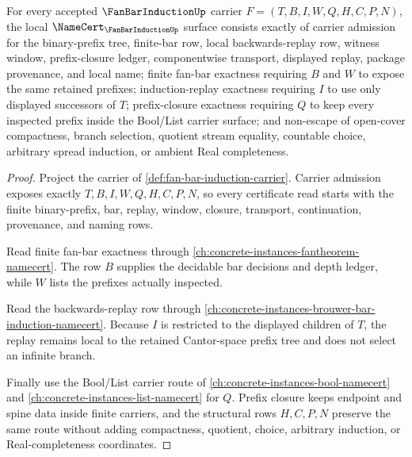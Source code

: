 \begin{theorem}
\label{thm:fan-bar-induction-namecert-obligations}
For every accepted $\FanBarInductionUp$ carrier $F=(T,B,I,W,Q,H,C,P,N)$, the local $\NameCert_{\FanBarInductionUp}$ surface consists exactly of carrier admission for the binary-prefix tree, finite-bar row, local backwards-replay row, witness window, prefix-closure ledger, componentwise transport, displayed replay, package provenance, and local name; finite fan-bar exactness requiring $B$ and $W$ to expose the same retained prefixes; induction-replay exactness requiring $I$ to use only displayed successors of $T$; prefix-closure exactness requiring $Q$ to keep every inspected prefix inside the Bool/List carrier surface; and non-escape of open-cover compactness, branch selection, quotient stream equality, countable choice, arbitrary spread induction, or ambient Real completeness.
\end{theorem}
\begin{proof}
Project the carrier of \autoref{def:fan-bar-induction-carrier}. Carrier admission exposes exactly $T,B,I,W,Q,H,C,P,N$, so every certificate read starts with the finite binary-prefix, bar, replay, window, closure, transport, continuation, provenance, and naming rows.

Read finite fan-bar exactness through \autoref{ch:concrete-instances-fantheorem-namecert}. The row $B$ supplies the decidable bar decisions and depth ledger, while $W$ lists the prefixes actually inspected.

Read the backwards-replay row through \autoref{ch:concrete-instances-brouwer-bar-induction-namecert}. Because $I$ is restricted to the displayed children of $T$, the replay remains local to the retained Cantor-space prefix tree and does not select an infinite branch.

Finally use the Bool/List carrier route of \autoref{ch:concrete-instances-bool-namecert} and \autoref{ch:concrete-instances-list-namecert} for $Q$. Prefix closure keeps endpoint and spine data inside finite carriers, and the structural rows $H,C,P,N$ preserve the same route without adding compactness, quotient, choice, arbitrary induction, or Real-completeness coordinates.
\end{proof}

